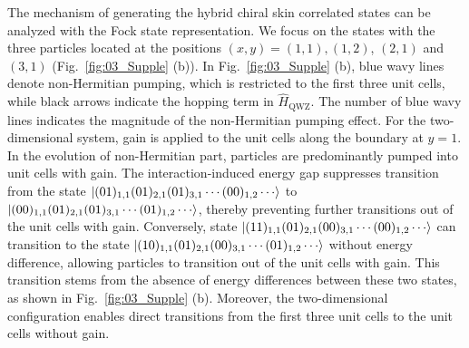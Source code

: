 \documentclass[longbibliography, aps, prx, amsmath, amssymb, amsfonts, twocolumn,superscriptaddress, footinbib]{revtex4-1}
\begin{document}
	The mechanism of generating the hybrid chiral skin correlated states can be analyzed with the Fock state representation. 
	We focus on the states with the three particles located at the positions $(x,y)=(1,1), (1,2)$, $(2,1)$ and $(3,1)$ (Fig.~\ref{fig:03_Supple} (b)).
	In Fig.~\ref{fig:03_Supple} (b), blue wavy lines denote non-Hermitian pumping, which is restricted to the first three unit cells, while black arrows indicate the hopping term in $\hat{H}_{\text{QWZ}}$. The number of blue wavy lines indicates the magnitude of the non-Hermitian pumping effect.
	For the two-dimensional system, gain is applied to the unit cells along the boundary at $y=1$.
	In the evolution of non-Hermitian part, particles are predominantly pumped into unit cells with gain. The interaction-induced energy gap suppresses transition from the state 
	$\ket{(01)_{1,1}(01)_{2,1}(01)_{3,1}\cdots(00)_{1,2}\cdots}$ to $\ket{(00)_{1,1}(01)_{2,1}(01)_{3,1}\cdots(01)_{1,2}\cdots}$,
	 thereby preventing further transitions out of the unit cells with gain. 
	Conversely, state $\ket{(11)_{1,1}(01)_{2,1}(00)_{3,1}\cdots(00)_{1,2}\cdots}$ can transition to the state $\ket{(10)_{1,1}(01)_{2,1}(00)_{3,1}\cdots(01)_{1,2}\cdots}$ 
	without energy difference, allowing particles to transition out of the unit cells with gain. This transition stems from the absence of energy differences between these two states, as shown in Fig.~\ref{fig:03_Supple} (b). 
	Moreover, the two-dimensional configuration enables direct transitions from the first three unit cells to the unit cells without gain.
\end{document}

